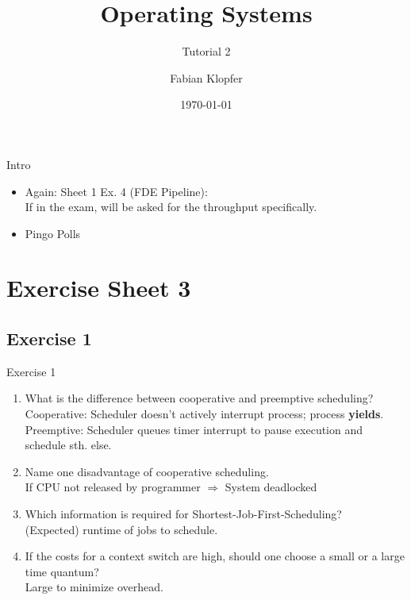 \documentclass[10pt]{beamer}
\title{\textbf{Operating Systems}}
\subtitle{Tutorial 2}
\author{Fabian Klopfer}
\date{\today}
\begin{document}
\frame{\titlepage}


\begin{frame}{Intro}
\begin{itemize}
 \item Again: Sheet 1 Ex. 4 (FDE Pipeline): \\
 If in the exam, will be asked for the throughput specifically.
 \item Pingo Polls
\end{itemize}
\end{frame}

\section*{Exercise Sheet 3}
\frame{\sectionpage}
\subsection*{Exercise 1}
\frame{\subsectionpage}
\begin{frame}{Exercise 1}
    \begin{enumerate}
		\item What is the difference between cooperative and preemptive scheduling? \\
		\alert{Cooperative: Scheduler doesn't actively interrupt process; process \textbf{yields}. \\
		Preemptive: Scheduler queues timer interrupt to pause execution and schedule sth. else.}
		\item Name one disadvantage of cooperative scheduling. \\
		\alert{If CPU not released by programmer $\Rightarrow$ System deadlocked}
		\item Which information is required for Shortest-Job-First-Scheduling? \\
		\alert{(Expected) runtime of jobs to schedule.}
		\item If the costs for a context switch are high, should one choose a small or a large time quantum? \\
		\alert{Large to minimize overhead.}
	\end{enumerate}
\end{frame}
\end{document}
